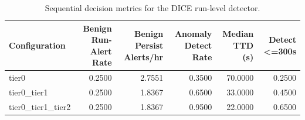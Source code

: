 \begin{table}[t]
\centering
\caption{Sequential decision metrics for the DICE run-level detector.}
\label{tab:dice_sequential_metrics}
\footnotesize
\begin{tabular}{lrrrrr}
\toprule
Configuration & Benign Run-Alert Rate & Benign Persist Alerts/hr & Anomaly Detect Rate & Median TTD (s) & Detect <=300s \\
\midrule
tier0 & 0.2500 & 2.7551 & 0.3500 & 70.0000 & 0.2500 \\
tier0_tier1 & 0.2500 & 1.8367 & 0.6500 & 33.0000 & 0.4500 \\
tier0_tier1_tier2 & 0.2500 & 1.8367 & 0.9500 & 22.0000 & 0.6500 \\
\bottomrule
\end{tabular}

\end{table}
